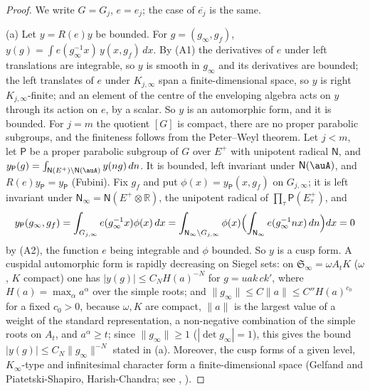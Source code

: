\documentclass[10pt]{amsart}
\theoremstyle{definition}
\theoremstyle{remark}
\newcommand{\R}{\mathbb R}
\begin{document}
\begin{proof}
We write $G=G_j$, $e=e_j$; the case of $\overline{e_j}$ is the same.

(a) Let $y=R(e)y$ be bounded. For $g=(g_\infty,g_f)$, $y(g)=\int e(g_\infty^{-1}x)\,y(x,g_f)\,dx$.
By (A1) the derivatives of $e$ under left translations are integrable, so $y$ is smooth in
$g_\infty$ and its derivatives are bounded; the left translates of $e$ under $K_{j,\infty}$ span a finite-dimensional
space, so $y$ is right $K_{j,\infty}$-finite; and an element of the centre of the enveloping
algebra acts on $y$ through its action on $e$, by a scalar. So $y$ is an automorphic form, and it
is bounded. For $j=m$ the quotient $[G]$ is compact, there are no proper parabolic subgroups, and
the finiteness follows from the Peter--Weyl theorem. Let $j<m$,
let $\mathsf P$ be a proper parabolic subgroup of $G$ over $E^+$ with unipotent radical
$\mathsf N$, and $y_{\mathsf P}(g)=\int_{\mathsf N(E^+)\backslash\mathsf N(\auA)}y(ng)\,dn$. It is
bounded, left invariant under $\mathsf N(\auA)$, and $R(e)y_{\mathsf P}=y_{\mathsf P}$ (Fubini).
Fix $g_f$ and put $\phi(x)=y_{\mathsf P}(x,g_f)$ on $G_{j,\infty}$; it is left invariant under
$\mathsf N_\infty=\mathsf N(E^+\otimes\R)$, the unipotent radical of $\prod_\tau\mathsf P(E^+_\tau)$,
and
\[
y_{\mathsf P}(g_\infty,g_f)=\int_{G_{j,\infty}}e(g_\infty^{-1}x)\phi(x)\,dx=\int_{\mathsf N_\infty
\backslash G_{j,\infty}}\phi(x)\Bigl(\int_{\mathsf N_\infty}e(g_\infty^{-1}nx)\,dn\Bigr)dx=0
\]
by (A2), the function $e$ being integrable and $\phi$ bounded. So $y$ is a cusp form. A cuspidal
automorphic form is rapidly decreasing on Siegel sets: on $\mathfrak S_\infty=\omega A_tK$ ($\omega$, $K$ compact) one has $|y(g)|\le C_NH(a)^{-N}$ for $g=uak\,ck'$, where $H(a)=\max_\alpha a^\alpha$ over the simple roots; and $\|g_\infty\|\le C\|a\|\le C''H(a)^{c_0}$ for a fixed $c_0>0$, because $\omega,K$ are compact, $\|a\|$ is the largest value of a weight of the standard representation, a non-negative combination of the simple roots on $A_t$, and $a^\alpha\ge t$; since $\|g_\infty\|\ge1$ ($|\det g_\infty|=1$), this gives the bound $|y(g)|\le C_N\|g_\infty\|^{-N}$ stated in (a). Moreover, the cusp forms of a given level,
$K_\infty$-type and infinitesimal character form a finite-dimensional space (Gelfand and
Piatetski-Shapiro, Harish-Chandra; see \cite[\S1.8, p.~192]{BorelJacquet}, \cite[Chapter~I, Theorem~1, p.~8]{HarishChandraAF}).


\end{proof}
\end{document}
